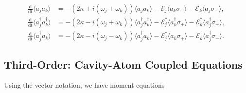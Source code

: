 \documentclass{article}
\newcommand{\ddt}[1][]{\frac{\mathrm{d} #1}{\mathrm{d}t}}
\begin{document}
\begin{subequations}
	\begin{align}
		\ddt \langle a_{j} a_{k} \rangle &= -\left( 2 \kappa + i \left( \omega_{j} + \omega_{k} \right) \right) \langle a_{j} a_{k} \rangle - \mathcal{E}_{j} \langle a_{k} \sigma_{-} \rangle - \mathcal{E}_{k} \langle a_{j} \sigma_{-} \rangle, \\
		\ddt \langle a^{\dagger}_{j} a^{\dagger}_{k} \rangle &= -\left( 2 \kappa - i \left( \omega_{j} + \omega_{k} \right) \right) \langle a^{\dagger}_{j} a^{\dagger}_{k} \rangle - \mathcal{E}_{j}^{*} \langle a^{\dagger}_{k} \sigma_{+} \rangle - \mathcal{E}_{k}^{*} \langle a^{\dagger}_{j} \sigma_{+} \rangle, \\
		\ddt \langle a^{\dagger}_{j} a_{k} \rangle &= -\left( 2 \kappa - i \left( \omega_{j}- \omega_{k} \right) \right) \langle a^{\dagger}_{j} a_{k} \rangle - \mathcal{E}_{j}^{*} \langle a_{k} \sigma_{+} \rangle - \mathcal{E}_{k} \langle a^{\dagger}_{j} \sigma_{-} \rangle.
	\end{align}
\end{subequations}

\subsection{Third-Order: Cavity-Atom Coupled Equations}

Using the vector notation, we have moment equations
\end{document}
